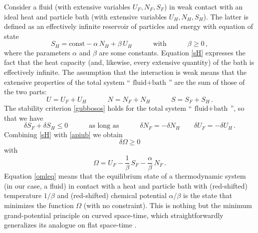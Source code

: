 \documentclass[a4paper, amsfonts, amssymb, amsmath, reprint, showkeys, nofootinbib, twoside, onecolumn,notitlepage]{revtex4-1}
\newcommand{\spc}{\quad \quad \quad}
\begin{document}
Consider a fluid (with extensive variables $U_F,N_F,S_F$) in weak contact with an ideal heat and particle bath (with extensive variables $U_H,N_H,S_H$). The latter is defined as an effectively infinite reservoir of particles and energy with equation of state \cite{Termo,GavassinoTermometri}
\begin{equation}\label{sH}
S_H = \text{const} - \alpha \, N_H +\beta \, U_H \spc \text{with}\spc \beta \geq 0 \, ,
\end{equation}
where the parameters $\alpha$ and $\beta$ are some constants. Equation \eqref{sH} expresses the fact that the heat capacity (and, likewise, every extensive quantity) of the bath is effectively infinite. The assumption that the interaction is weak means that the extensive properties of the total system ``$\, \text{fluid} + \text{bath} \,$'' are the sum of those of the two parts:
\begin{equation}
U=U_F+U_H \spc  N=N_F+N_H \spc S=S_F+S_H \, . 
\end{equation}
The stability criterion \eqref{gubbosos} holds for the total system ``$\, \text{fluid} + \text{bath} \,$'', so that we have
\begin{equation}\label{apiub}
\delta S_F + \delta S_H \leq 0 \spc \text{as long as} \spc \delta N_F =-\delta N_H \quad \quad \delta U_F =-\delta U_H \, . 
\end{equation}
Combining \eqref{sH} with \eqref{apiub} we obtain
\begin{equation}\label{omleq}
\delta \Omega \geq 0
\end{equation}
with
\begin{equation}\label{Omega}
\Omega = U_F-\dfrac{1}{\beta} \, S_F - \dfrac{\alpha}{\beta} \, N_F \, .
\end{equation}
Equation \eqref{omleq} means that the equilibrium state of a thermodynamic system (in our case, a fluid) in contact with a heat and particle bath with (red-shifted) temperature $1/\beta$ and (red-shifted) chemical potential $\alpha/\beta$ is the state that minimizes the function $\Omega$ (with no constraint). This is nothing but the minimum grand-potential principle on curved space-time, which straightforwardly generalizes its analogue on flat space-time \cite{Callen_book,peliti_book}.
\end{document}
